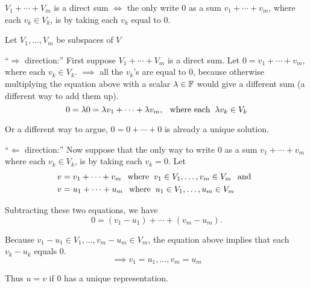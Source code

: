 \setcounter{thm}{44}
\begin{thm} 
  \label{thm: condition for a direct sum}
  $V_1 + \cdots + V_m$ is a direct sum $\iff$ the only write $0$ as a sum $v_1 + \cdots + v_m$, where each $v_k \in V_k$, is by taking each $v_k$ equal to $0$.
\end{thm}
\begin{prf} 
    Let  $V_1, \ldots, V_m$ be subspaces of $V$ 
  
    ``$\Rightarrow$ direction:'' First suppose $V_1 + \cdots + V_m$ is a direct sum. Let $0 = v_1 + \cdots + v_m,$ where each $v_k \in V_k$.
    $\implies$ all the $v_k$'s are equal to $0$, because otherwise multiplying the equation above with a scalar $\lambda \in \mathbb{F}$ would give a different sum (a different way to add them up).
    \begin{equation}
      0 = \lambda0= \lambda v_1 + \cdots + \lambda v_m, \;\;\, \text{where each}\;\; \lambda v_k \in V_k
    \end{equation}
    
    Or a different way to argue, $0 = 0 + \cdots + 0$ is already a unique solution. 
    
    ``$\Leftarrow$ direction:'' Now suppose that the only way to write $0$ as a sum $v_1 + \cdots + v_m$ where each $v_k \in V_k$, is by taking each $v_k = 0$. Let
    \begin{equation}
      \begin{aligned}
        v&=v_1 + \cdots + v_m \;\;\, \text{where}\;\; v_1 \in V_1, \ldots, v_m \in V_m \;\;\, \text{and}\;\; \\
        v&=u_1 + \cdots + u_m  \;\;\, \text{where}\;\; u_1 \in V_1, \ldots, u_m \in V_m
      \end{aligned}
    \end{equation}
    
    Subtracting these two equations, we have
    \begin{equation}
      0=(v_1-u_1)+\cdots+(v_m-u_m).
    \end{equation}
    
    Because $v_1 - u_1 \in V_1, \ldots, v_m - u_m \in V_m$, the equation above implies that each $v_k -u_k$ equals $0$.
    \begin{equation}
      \implies v_1=u_1, \ldots, v_m=u_m
    \end{equation}
    
    Thus $u=v$ if $0$ has a unique representation.
\end{prf}

